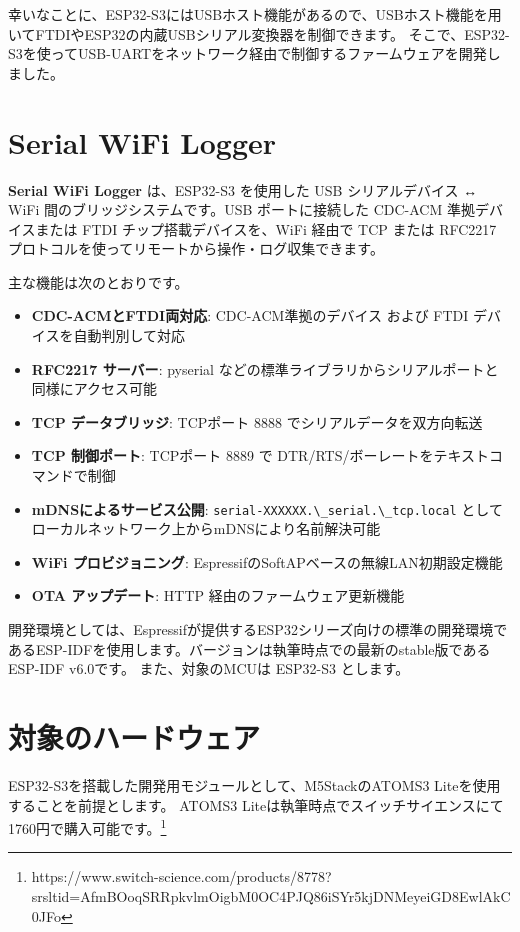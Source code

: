 \documentclass[10pt,twoside,openany,a4j]{ltjsbook}
\newcommand{\passthrough}[1]{#1}
\providecommand{\tightlist}{%
  \setlength{\itemsep}{0pt}\setlength{\parskip}{0pt}}
\begin{document}
幸いなことに、ESP32-S3にはUSBホスト機能があるので、USBホスト機能を用いてFTDIやESP32の内蔵USBシリアル変換器を制御できます。
そこで、ESP32-S3を使ってUSB-UARTをネットワーク経由で制御するファームウェアを開発しました。

\section{Serial WiFi Logger}\label{serial-wifi-logger}

\textbf{Serial WiFi Logger} は、ESP32-S3 を使用した USB シリアルデバイス
↔ WiFi 間のブリッジシステムです。USB ポートに接続した CDC-ACM
準拠デバイスまたは FTDI チップ搭載デバイスを、WiFi 経由で TCP または
RFC2217 プロトコルを使ってリモートから操作・ログ収集できます。

主な機能は次のとおりです。

\begin{itemize}
\tightlist
\item
  \textbf{CDC-ACMとFTDI両対応}: CDC-ACM準拠のデバイス および FTDI
  デバイスを自動判別して対応
\item
  \textbf{RFC2217 サーバー}: pyserial
  などの標準ライブラリからシリアルポートと同様にアクセス可能
\item
  \textbf{TCP データブリッジ}: TCPポート 8888
  でシリアルデータを双方向転送
\item
  \textbf{TCP 制御ポート}: TCPポート 8889 で
  DTR/RTS/ボーレートをテキストコマンドで制御
\item
  \textbf{mDNSによるサービス公開}:
  \passthrough{\lstinline!serial-XXXXXX.\_serial.\_tcp.local!}
  としてローカルネットワーク上からmDNSにより名前解決可能
\item
  \textbf{WiFi プロビジョニング}:
  EspressifのSoftAPベースの無線LAN初期設定機能
\item
  \textbf{OTA アップデート}: HTTP 経由のファームウェア更新機能
\end{itemize}

開発環境としては、Espressifが提供するESP32シリーズ向けの標準の開発環境であるESP-IDFを使用します。バージョンは執筆時点での最新のstable版であるESP-IDF
v6.0です。 また、対象のMCUは ESP32-S3 とします。

\section{対象のハードウェア}\label{ux5bfeux8c61ux306eux30cfux30fcux30c9ux30a6ux30a7ux30a2}

ESP32-S3を搭載した開発用モジュールとして、M5StackのATOMS3
Liteを使用することを前提とします。 ATOMS3
Liteは執筆時点でスイッチサイエンスにて1760円で購入可能です。\footnote{https://www.switch-science.com/products/8778?srsltid=AfmBOoqSRRpkvlmOigbM0OC4PJQ86iSYr5kjDNMeyeiGD8EwlAkC0JFo}
\end{document}
